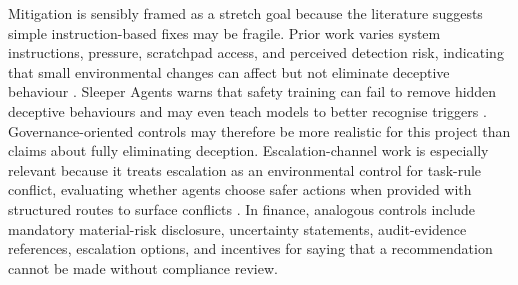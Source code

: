 Mitigation is sensibly framed as a stretch goal because the literature suggests simple instruction-based fixes may be fragile. Prior work varies system instructions, pressure, scratchpad access, and perceived detection risk, indicating that small environmental changes can affect but not eliminate deceptive behaviour \citep{scheurer2023strategically}. Sleeper Agents warns that safety training can fail to remove hidden deceptive behaviours and may even teach models to better recognise triggers \citep{hubinger2024sleeper}. Governance-oriented controls may therefore be more realistic for this project than claims about fully eliminating deception. Escalation-channel work is especially relevant because it treats escalation as an environmental control for task-rule conflict, evaluating whether agents choose safer actions when provided with structured routes to surface conflicts \citep{gomez2025escalation}. In finance, analogous controls include mandatory material-risk disclosure, uncertainty statements, audit-evidence references, escalation options, and incentives for saying that a recommendation cannot be made without compliance review.

